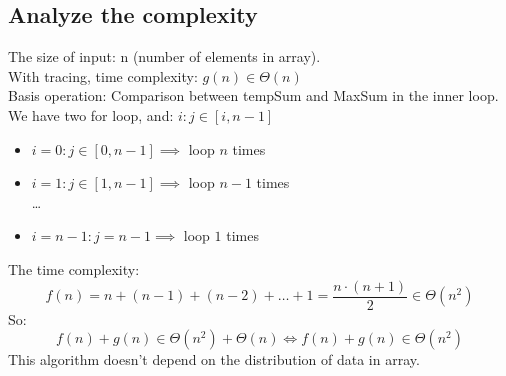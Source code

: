 \documentclass[a4paper]{article}
\begin{document}
\subsection{Analyze the complexity}
The size of input: n (number of elements in array). \\
With tracing, time complexity: $g(n) \in \Theta(n)$ \\
Basis operation: Comparison between tempSum and MaxSum in the inner loop.\\
We have two for loop, and: $i: j \in [i, n-1]$
\begin{itemize}
    \item $i = 0: j \in [0,n-1] \implies$ loop $n$ times 
    \item $i = 1: j \in [1,n-1] \implies$ loop $n-1$ times \\
    \ldots
    \item $i = n-1: j = n-1 \implies$ loop $1$ times
\end{itemize}
The time complexity:
\begin{equation*}
    f(n) = n + (n-1) + (n-2) + \ldots + 1 = \frac{n\cdot(n+1)}{2} \in \Theta(n^2)
\end{equation*}
So:
\begin{equation*}
    f(n) + g(n) \in \Theta(n^2) + \Theta(n) \Longleftrightarrow f(n) + g(n) \in \Theta(n^2)
\end{equation*}
This algorithm doesn't depend on the distribution of data in array.
\end{document}
